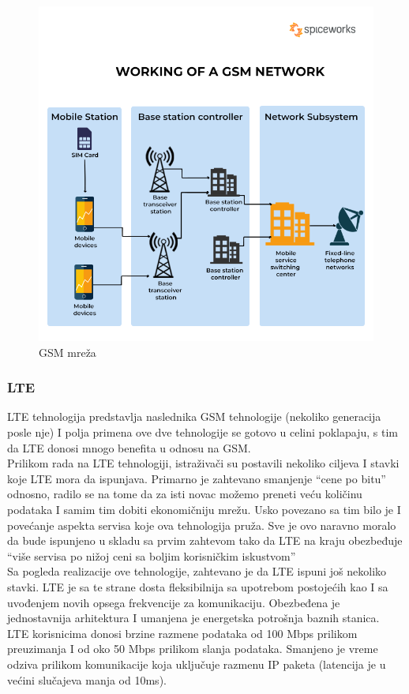 \documentclass[a4paper]{article}
\begin{document}
{\begin{figure}[h!]
\begin{center}
\includegraphics[scale=0.35]{GSM.png}
\end{center}
\caption{GSM mreža \cite{GSM}}
\label{fig:GSM}
\end{figure}
\newpage
        \subsubsection{LTE}
LTE tehnologija predstavlja naslednika GSM tehnologije (nekoliko generacija posle nje) I polja primena ove dve tehnologije se gotovo u celini poklapaju, s tim da LTE donosi mnogo benefita u odnosu na GSM.\\
Prilikom rada na LTE tehnologiji, istraživači su postavili nekoliko ciljeva I stavki koje LTE mora da ispunjava. Primarno je zahtevano smanjenje “cene po bitu” odnosno, radilo se na tome da za isti novac možemo preneti veću količinu podataka I samim tim dobiti ekonomičniju mrežu. Usko povezano sa tim bilo je I povećanje aspekta servisa koje ova tehnologija pruža. Sve je ovo naravno moralo da bude ispunjeno u skladu sa prvim zahtevom tako da LTE na kraju obezbeđuje “više servisa po nižoj ceni sa boljim korisničkim iskustvom”\\
Sa pogleda realizacije ove tehnologije, zahtevano je da LTE ispuni još nekoliko stavki. LTE je sa te strane dosta fleksibilnija sa upotrebom postojećih kao I sa uvođenjem novih opsega frekvencije za komunikaciju. Obezbeđena je jednostavnija arhitektura I umanjena je energetska potrošnja baznih stanica.\\
LTE korisnicima donosi brzine razmene podataka od 100 Mbps prilikom preuzimanja I od oko 50 Mbps prilikom slanja podataka. Smanjeno je vreme odziva prilikom komunikacije koja uključuje razmenu IP paketa (latencija je u većini slučajeva manja od 10ms).\\

}
\end{document}
